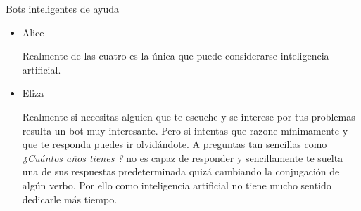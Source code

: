 \documentclass[spanish, a4paper, 12pt]{article} 	%
\begin{document}
\begin{section}{Bots inteligentes de ayuda}
\begin{itemize}
	Con esto basta para darse cuenta que está lejos de poder ser denominado inteligencia artificial.
		\item{Alice}
		
		Realmente de las cuatro es la única que puede considerarse inteligencia artificial.
		\item{Eliza}
		
	Realmente si necesitas alguien que te escuche y se interese por tus problemas resulta un bot muy interesante. Pero si intentas que razone mínimamente y que te responda puedes ir olvidándote. A preguntas tan sencillas como  \textit{¿Cuántos años tienes ?} no es capaz de responder y sencillamente te suelta una de sus respuestas predeterminada quizá cambiando la conjugación de algún verbo. Por ello como inteligencia artificial no tiene mucho sentido dedicarle más tiempo.
	
	\end{itemize}
\end{section}
\end{document}
